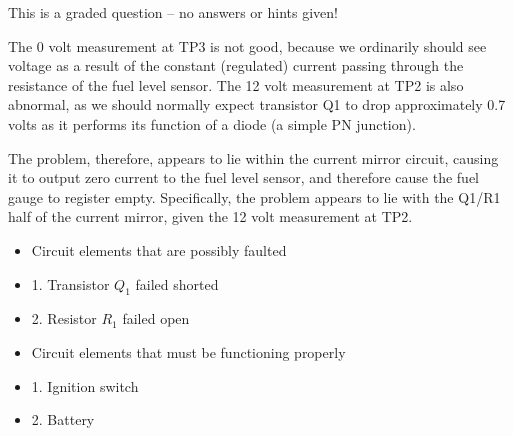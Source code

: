 This is a graded question -- no answers or hints given!







The 0 volt measurement at TP3 is not good, because we ordinarily should see voltage as a result of the constant (regulated) current passing through the resistance of the fuel level sensor.  The 12 volt measurement at TP2 is also abnormal, as we should normally expect transistor Q1 to drop approximately 0.7 volts as it performs its function of a diode (a simple PN junction).  

\vskip 10pt

The problem, therefore, appears to lie within the current mirror circuit, causing it to output zero current to the fuel level sensor, and therefore cause the fuel gauge to register empty.  Specifically, the problem appears to lie with the Q1/R1 half of the current mirror, given the 12 volt measurement at TP2.

\vskip 10pt

\begin{itemize}
\item{} Circuit elements that are possibly faulted
\item{1.} Transistor $Q_1$ failed shorted
\item{2.} Resistor $R_1$ failed open
\end{itemize}

\begin{itemize}
\item{} Circuit elements that must be functioning properly
\item{1.} Ignition switch
\item{2.} Battery
\end{itemize}




